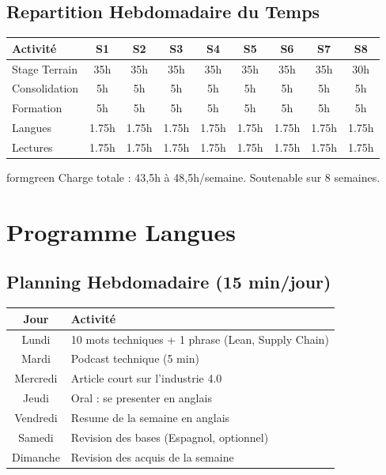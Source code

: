 \documentclass[12pt,a4paper]{article}
\begin{document}
\subsection*{Repartition Hebdomadaire du Temps}

\begin{table}[h]
\centering
\small
\begin{tabular}{|l|c|c|c|c|c|c|c|c|}
\hline
\rowcolor{gray!20}
\textbf{Activité} & \textbf{S1} & \textbf{S2} & \textbf{S3} & \textbf{S4} & \textbf{S5} & \textbf{S6} & \textbf{S7} & \textbf{S8} \\
\hline
Stage Terrain & 35h & 35h & 35h & 35h & 35h & 35h & 35h & 30h \\
Consolidation & 5h & 5h & 5h & 5h & 5h & 5h & 5h & 5h \\
Formation & 5h & 5h & 5h & 5h & 5h & 5h & 5h & 5h \\
Langues & 1.75h & 1.75h & 1.75h & 1.75h & 1.75h & 1.75h & 1.75h & 1.75h \\
Lectures & 1.75h & 1.75h & 1.75h & 1.75h & 1.75h & 1.75h & 1.75h & 1.75h \\
\hline
\end{tabular}
\end{table}

\begin{infobox}{formgreen}
\centering
Charge totale : 43,5h à 48,5h/semaine. Soutenable sur 8 semaines.
\end{infobox}

\newpage

\section{Programme Langues}

\subsection*{Planning Hebdomadaire (15 min/jour)}

\begin{table}[h]
\centering
\begin{tabular}{|c|p{10cm}|}
\hline
\rowcolor{gray!20}
\textbf{Jour} & \textbf{Activité} \\
\hline
Lundi & 10 mots techniques + 1 phrase (Lean, Supply Chain) \\
Mardi & Podcast technique (5 min) \\
Mercredi & Article court sur l'industrie 4.0 \\
Jeudi & Oral : se presenter en anglais \\
Vendredi & Resume de la semaine en anglais \\
Samedi & Revision des bases (Espagnol, optionnel) \\
Dimanche & Revision des acquis de la semaine \\
\hline
\end{tabular}
\end{table}
\end{document}
